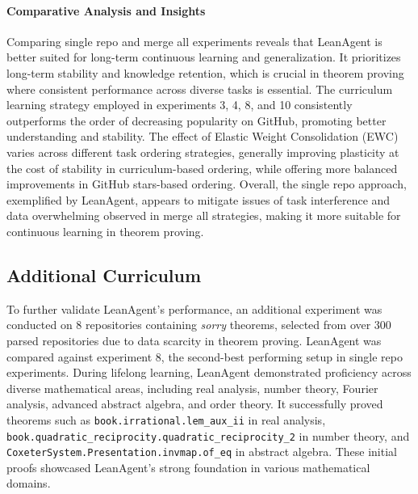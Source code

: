 \documentclass{article} %
\begin{document}
\paragraph{Comparative Analysis and Insights}
Comparing single repo and merge all experiments reveals that LeanAgent is better suited for long-term continuous learning and generalization. It prioritizes long-term stability and knowledge retention, which is crucial in theorem proving where consistent performance across diverse tasks is essential. The curriculum learning strategy employed in experiments 3, 4, 8, and 10 consistently outperforms the order of decreasing popularity on GitHub, promoting better understanding and stability. The effect of Elastic Weight Consolidation (EWC) varies across different task ordering strategies, generally improving plasticity at the cost of stability in curriculum-based ordering, while offering more balanced improvements in GitHub stars-based ordering. Overall, the single repo approach, exemplified by LeanAgent, appears to mitigate issues of task interference and data overwhelming observed in merge all strategies, making it more suitable for continuous learning in theorem proving.


\subsection{Additional Curriculum}
To further validate LeanAgent's performance, an additional experiment was conducted on 8 repositories containing \textit{sorry} theorems, selected from over 300 parsed repositories due to data scarcity in theorem proving. LeanAgent was compared against experiment 8, the second-best performing setup in single repo experiments. During lifelong learning, LeanAgent demonstrated proficiency across diverse mathematical areas, including real analysis, number theory, Fourier analysis, advanced abstract algebra, and order theory. It successfully proved theorems such as \texttt{book.irrational.lem\_aux\_ii} in real analysis, \texttt{book.quadratic\_reciprocity.quadratic\_reciprocity\_2} in number theory, and \texttt{CoxeterSystem.Presentation.invmap.of\_eq} in abstract algebra. These initial proofs showcased LeanAgent's strong foundation in various mathematical domains.
\end{document}
